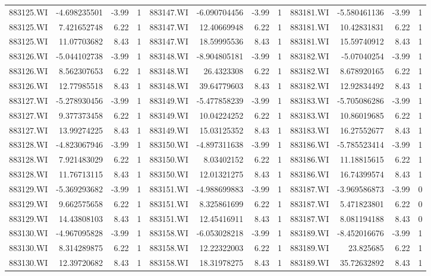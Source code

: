 \documentclass{sysuthesis}
\begin{document}
\begin{table}[htbp]
{\begin{tabular}{rrrrrrrrrrrr}
    883125.WI & -4.698235501 & -3.99 & 1     & 883147.WI & -6.090704456 & -3.99 & 1     & 883181.WI & -5.580461136 & -3.99 & 1 \\
    883125.WI & 7.421652748 & 6.22  & 1     & 883147.WI & 12.40669948 & 6.22  & 1     & 883181.WI & 10.42831831 & 6.22  & 1 \\
    883125.WI & 11.07703682 & 8.43  & 1     & 883147.WI & 18.59995536 & 8.43  & 1     & 883181.WI & 15.59740912 & 8.43  & 1 \\
    883126.WI & -5.044102738 & -3.99 & 1     & 883148.WI & -8.904805181 & -3.99 & 1     & 883182.WI & -5.07040254 & -3.99 & 1 \\
    883126.WI & 8.562307653 & 6.22  & 1     & 883148.WI & 26.4323308 & 6.22  & 1     & 883182.WI & 8.678920165 & 6.22  & 1 \\
    883126.WI & 12.77985518 & 8.43  & 1     & 883148.WI & 39.64779603 & 8.43  & 1     & 883182.WI & 12.92834492 & 8.43  & 1 \\
    883127.WI & -5.278930456 & -3.99 & 1     & 883149.WI & -5.477858239 & -3.99 & 1     & 883183.WI & -5.705086286 & -3.99 & 1 \\
    883127.WI & 9.377373458 & 6.22  & 1     & 883149.WI & 10.04224252 & 6.22  & 1     & 883183.WI & 10.86019685 & 6.22  & 1 \\
    883127.WI & 13.99274225 & 8.43  & 1     & 883149.WI & 15.03125352 & 8.43  & 1     & 883183.WI & 16.27552677 & 8.43  & 1 \\
    883128.WI & -4.823067946 & -3.99 & 1     & 883150.WI & -4.897311638 & -3.99 & 1     & 883186.WI & -5.785523414 & -3.99 & 1 \\
    883128.WI & 7.921483029 & 6.22  & 1     & 883150.WI & 8.03402152 & 6.22  & 1     & 883186.WI & 11.18815615 & 6.22  & 1 \\
    883128.WI & 11.76713115 & 8.43  & 1     & 883150.WI & 12.01321275 & 8.43  & 1     & 883186.WI & 16.74399574 & 8.43  & 1 \\
    883129.WI & -5.369293682 & -3.99 & 1     & 883151.WI & -4.988699883 & -3.99 & 1     & 883187.WI & -3.969586873 & -3.99 & 0 \\
    883129.WI & 9.662575658 & 6.22  & 1     & 883151.WI & 8.325861699 & 6.22  & 1     & 883187.WI & 5.471823801 & 6.22  & 0 \\
    883129.WI & 14.43808103 & 8.43  & 1     & 883151.WI & 12.45416911 & 8.43  & 1     & 883187.WI & 8.081194188 & 8.43  & 0 \\
    883130.WI & -4.967095828 & -3.99 & 1     & 883158.WI & -6.053028218 & -3.99 & 1     & 883189.WI & -8.452016676 & -3.99 & 1 \\
    883130.WI & 8.314289875 & 6.22  & 1     & 883158.WI & 12.22322003 & 6.22  & 1     & 883189.WI & 23.825685 & 6.22  & 1 \\
    883130.WI & 12.39720682 & 8.43  & 1     & 883158.WI & 18.31978275 & 8.43  & 1     & 883189.WI & 35.72632892 & 8.43  & 1 \\

    \end{tabular}
    }
\end{table}
\end{document}
